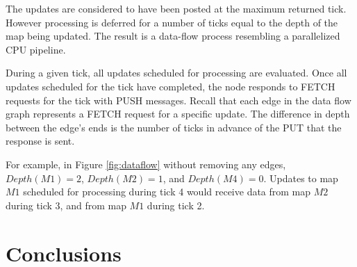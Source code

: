 \documentclass{sig-alternate}
\begin{document}
The updates are considered to have been posted at the maximum returned tick.  However processing is deferred for a number of ticks equal to the depth of the map being updated.  The result is a data-flow process resembling a parallelized CPU pipeline.

During a given tick, all updates scheduled for processing are evaluated.  Once all updates scheduled for the tick have completed, the node responds to FETCH requests for the tick with PUSH messages.  Recall that each edge in the data flow graph represents a FETCH request for a specific update.  The difference in depth between the edge's ends is the number of ticks in advance of the PUT that the response is sent.  

For example, in Figure \ref{fig:dataflow} without removing any edges, $Depth(M1) = 2$, $Depth(M2) = 1$, and $Depth(M4) = 0$.  Updates to map $M1$ scheduled for processing during tick 4 would receive data from map $M2$ during tick 3, and from map $M1$ during tick 2.

%
%
%
%
%
%

\section{Conclusions}
\label{sec:conclusions}



\end{document}
